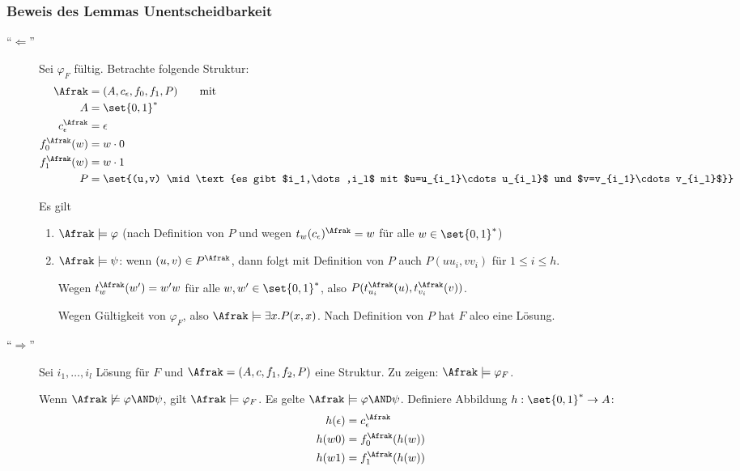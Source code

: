 \subsubsection{Beweis des Lemmas Unentscheidbarkeit}

\begin{description}
  \item[\enquote{$\Leftarrow$}]
  Sei $\varphi_F$ fültig. Betrachte folgende Struktur:
  \begin{align*}
    \Afrak &= (A, c_\epsilon, f_0, f_1, P) \qquad\text{mit} \\
    A &= \set{0,1}^*\\
    c_\epsilon^{\Afrak} &= \epsilon\\
    f_0^{\Afrak}(w) &= w \cdot 0\\
    f_1^{\Afrak}(w) &= w \cdot 1\\
    P &= \set{(u,v) \mid \text{es gibt $i_1,\dots,i_l$ mit $u=u_{i_1}\cdots u_{i_l}$ und $v=v_{i_1}\cdots v_{i_l}$}}
  \end{align*}
  
  Es gilt
  \begin{enumerate}
    \item $\Afrak \models \varphi$ (nach Definition von $P$ und wegen
    $t_w(c_\epsilon)^{\Afrak}=w$ für alle $w\in\set{0,1}^*$)
    
    \item $\Afrak \models \psi$: wenn $(u,v)\in P^{\Afrak}$, dann folgt
    mit Definition von $P$ auch $P(uu_i, vv_i)$ für $1\leq i\leq h$.
    
    Wegen $t_w^\Afrak(w') = w'w$ für alle $w,w'\in\set{0,1}^*$, also
    $P(t_{u_i}^\Afrak(u), t_{v_i}^\Afrak(v))$.

    Wegen Gültigkeit von $\varphi_F$, also $\Afrak \models \exists
    x.P(x,x)$. Nach Definition von $P$ hat $F$ aleo eine Lösung.
  \end{enumerate}
  
  \item[\enquote{$\Rightarrow$}]
  Sei $i_1,\dots,i_l$ Lösung für $F$ und $\Afrak = (A, c, f_1, f_2, P)$
  eine Struktur. Zu zeigen: $\Afrak\models\varphi_F$.
  
  Wenn $\Afrak\not\models \varphi\AND\psi$, gilt $\Afrak\models\varphi_F$.
  Es gelte $\Afrak\models\varphi\AND\psi$. Definiere Abbildung $h:\set{0,1}^*
  \rightarrow A$:
  \begin{align*}
    h(\epsilon) &= c_\epsilon^\Afrak\\
    h(w0) &= f_0^{\Afrak}(h(w))\\
    h(w1) &= f_1^{\Afrak}(h(w))
  \end{align*}
  

\end{description}
